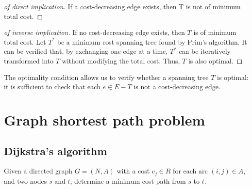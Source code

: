\documentclass[12pt, a4paper]{report}
\begin{document}
    \begin{proof}[of direct implication]
        If a cost-decreasing edge exists, then T is not of minimum total cost.
    \end{proof}
    \begin{proof}[of inverse implication]
        If no cost-decreasing edge exists, then $T$ is of minimum total cost. Let $T^{*}$ be a minimum cost spanning tree found by Prim's algorithm. It can be verified that, by 
        exchanging one edge at a time, $T^{*}$ can be iteratively transformed into $T$ without modifying the total cost. Thus, $T$ is also optimal. 
    \end{proof}
    The optimality condition allows us to verify whether a spanning tree $T$ is optimal: it is sufficient to check that each $e \in E-T$ is not a cost-decreasing edge. 

    \section{Graph shortest path problem}
    \subsection{Dijkstra's algorithm}
    Given a directed graph $G=(N,A)$ with a cost $c_j \in R$ for each arc $(i,j) \in A$, and two nodes $s$ and $t$, determine a minimum cost path from $s$ to $t$. 
\end{document}
